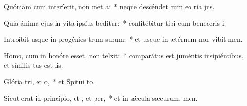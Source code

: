 \item Quóniam cum interíerit, non met a:~* neque descéndet cum eo ria jus.
\item Quia ánima ejus in vita ipsíus beditur:~* confitébitur tibi cum beneceris i.
\item Introíbit usque in progénies trum surum:~* et usque in ætérnum non vibit men.
\item Homo, cum in honóre esset, non telxit:~* comparátus est juméntis insipiéntibus, et símilis tus est lis.
\item Glória tri, et o,~* et Spitui to.
\item Sicut erat in princípio, et , et per,~* et in sǽcula sæcurum. men.
